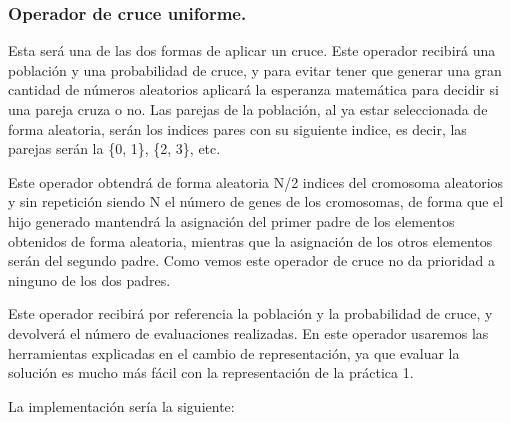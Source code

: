 \documentclass[12pt, spanish]{article}
\begin{document}
\subsubsection{Operador de cruce uniforme.}

Esta será una de las dos formas de aplicar un cruce. Este operador recibirá una población y una probabilidad de cruce, y para evitar tener que generar una gran cantidad de números aleatorios aplicará la esperanza matemática para decidir si una pareja cruza o no. Las parejas de la población, al ya estar seleccionada de forma aleatoria, serán los indices pares con su siguiente indice, es decir, las parejas serán la \{0, 1\}, \{2, 3\}, etc.

 Este operador obtendrá de forma aleatoria N/2 indices del cromosoma aleatorios y sin repetición siendo N el número de genes de los cromosomas, de forma que el hijo generado mantendrá la asignación del primer padre de los elementos obtenidos de forma aleatoria, mientras que la asignación de los otros elementos serán del segundo padre. Como vemos este operador de cruce no da prioridad a ninguno de los dos padres.
 
Este operador recibirá por referencia la población y la probabilidad de cruce, y devolverá el número de evaluaciones realizadas. En este operador usaremos las herramientas explicadas en el cambio de representación, ya que evaluar la solución es mucho más fácil con la representación de la práctica 1.
 
La implementación sería la siguiente:
\end{document}
